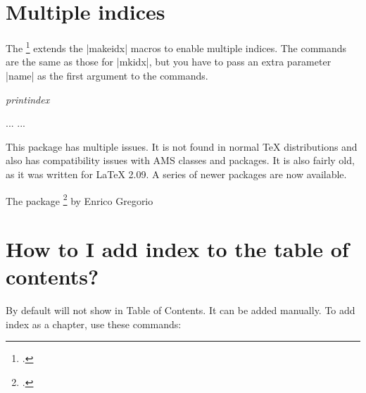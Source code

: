 \section{Multiple indices}

The \footcite{multind} extends the |makeidx| macros to enable multiple indices. The commands are the same as those for |mkidx|, but you have to pass an extra parameter |name| as the first argument to the commands.

\emph{printindex}
\begin{phdverbatim}
\usepackage{multind}
...
...
\end{phdverbatim}

This package has multiple issues. It is not found in normal TeX distributions and also has compatibility issues with AMS classes and packages. It is also fairly old, as it was written for LaTeX 2.09. A series of newer packages are now available.

The package \footcite{imakeidx} by Enrico Gregorio 

\section{How to I add index to the table of contents?}
By default \latexe will not show in Table of Contents. It can be added manually. To add index as a chapter, use these commands:

\begin{teXXX}
\clearpage
{}
\printindex
\end{teXXX}
\endinput























